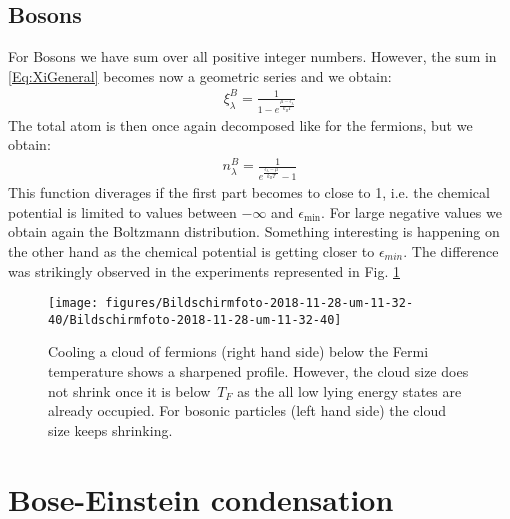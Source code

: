\documentclass[10pt]{article}
\begin{document}
\subsection{Bosons}
For Bosons we have sum over all positive integer numbers. However, the sum in \eqref{Eq:XiGeneral} becomes now a geometric series and we obtain:
\begin{align}
\xi_\lambda^B = \frac{1}{1-e^{\frac{\mu-\epsilon_\lambda}{k_BT}}}
\end{align}
The total atom is then once again decomposed like for the fermions, but we obtain:
\begin{align}\label{Eq:nB}
n_\lambda^B  = \frac{1}{e^{\frac{\epsilon_\lambda-\mu}{k_BT}}-1}
\end{align}
This function diverages if the first part becomes to close to 1, i.e. the chemical potential is limited to values between $-\infty$ and $\epsilon_\text{min}$. For large negative values we obtain again the Boltzmann distribution. Something interesting is happening on the other hand as the chemical potential is getting closer to $\epsilon_{min}$. The difference was strikingly observed in the experiments represented in Fig. \ref{249436}
\begin{figure}[h!]
\begin{center}
\texttt{[image: figures/Bildschirmfoto-2018-11-28-um-11-32-40/Bildschirmfoto-2018-11-28-um-11-32-40]}
\caption{{Cooling a cloud of fermions (right hand side) below the Fermi
temperature shows a sharpened profile. However, the cloud size does not
shrink once it is below~\(T_F\) as the all low lying energy
states are already occupied. For bosonic particles (left hand side) the
cloud size keeps shrinking.
{\label{249436}}%
}}
\end{center}
\end{figure}

\section{Bose-Einstein condensation}
\end{document}
